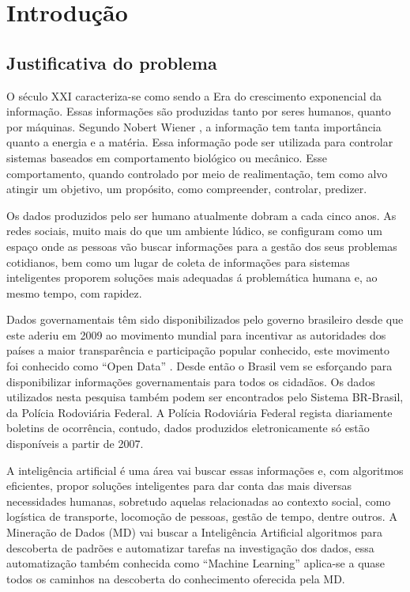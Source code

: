 \chapter{Introdução}\label{intro}

\section{Justificativa do problema}\label{intro:problem}

O século XXI caracteriza-se como sendo a Era do crescimento exponencial da informação. Essas informações são produzidas tanto por seres humanos, quanto por máquinas. Segundo Nobert Wiener \cite{Salles2007}, a informação tem tanta importância quanto a energia e a matéria. Essa informação pode ser utilizada para controlar sistemas baseados em comportamento biológico ou mecânico. Esse comportamento, quando controlado por meio de realimentação, tem como alvo atingir um objetivo, um propósito, como compreender, controlar, predizer.

Os dados produzidos pelo ser humano atualmente dobram a cada cinco anos. As redes sociais, muito mais do que um ambiente lúdico, se configuram como um espaço onde as pessoas vão buscar informações para a gestão dos seus problemas cotidianos, bem como um lugar de coleta de informações para sistemas inteligentes proporem soluções mais adequadas á problemática humana e, ao mesmo tempo, com rapidez.

Dados governamentais têm sido disponibilizados pelo governo brasileiro desde que este aderiu em 2009 ao movimento mundial para incentivar as autoridades dos países a maior transparência e participação popular conhecido, este movimento foi conhecido como ``Open Data'' \cite{DadosGoverno}. Desde então o Brasil vem se esforçando para disponibilizar informações governamentais para todos os cidadãos. Os dados utilizados nesta pesquisa também podem ser encontrados pelo Sistema BR-Brasil, da Polícia Rodoviária Federal. A Polícia Rodoviária Federal regista diariamente boletins de ocorrência, contudo, dados produzidos eletronicamente só estão disponíveis a partir de 2007.

A inteligência artificial é uma área vai buscar essas informações e, com algoritmos eficientes, propor soluções inteligentes para dar conta das mais diversas necessidades humanas, sobretudo aquelas relacionadas ao contexto social, como logística de transporte, locomoção de pessoas, gestão de tempo, dentre outros. A Mineração de Dados (MD) vai buscar a Inteligência Artificial algoritmos para descoberta de padrões e automatizar tarefas na investigação dos dados, essa automatização também conhecida como ``Machine Learning'' aplica-se a quase todos os caminhos na descoberta do conhecimento oferecida pela MD.
 
